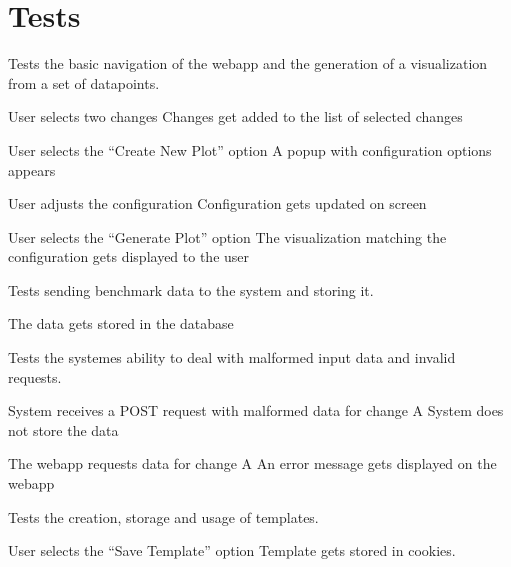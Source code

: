\section{Tests}


Tests the basic navigation of the webapp and the generation of a \gls{visualization} from a set of datapoints.

{User selects two changes}
{Changes get added to the list of selected changes}

{User selects the \enquote{Create New Plot} option}
{A popup with configuration options appears}

{User adjusts the configuration}
{Configuration gets updated on screen}

{User selects the \enquote{Generate Plot} option}
{The \gls{visualization} matching the configuration gets displayed to the user}


Tests sending benchmark data to the system and storing it.

{The data gets stored in the database}


Tests the systemes ability to deal with malformed input data and invalid requests.

{System receives a POST request with malformed data for change A}
{System does not store the data}

{The webapp requests data for change A}
{An error message gets displayed on the webapp}


Tests the creation, storage and usage of templates.

{User selects the \enquote{Save Template} option}
{Template gets stored in cookies.}

